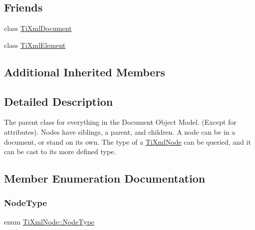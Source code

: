 \subsection*{Friends}
\begin{DoxyCompactItemize}
\item 
class \hyperlink{class_ti_xml_node_a173617f6dfe902cf484ce5552b950475}{Ti\+Xml\+Document}
\item 
class \hyperlink{class_ti_xml_node_ab6592e32cb9132be517cc12a70564c4b}{Ti\+Xml\+Element}
\end{DoxyCompactItemize}
\subsection*{Additional Inherited Members}


\subsection{Detailed Description}
The parent class for everything in the Document Object Model. (Except for attributes). Nodes have siblings, a parent, and children. A node can be in a document, or stand on its own. The type of a \hyperlink{class_ti_xml_node}{Ti\+Xml\+Node} can be queried, and it can be cast to its more defined type. 

\subsection{Member Enumeration Documentation}
\mbox{\label{class_ti_xml_node_a836eded4920ab9e9ef28496f48cd95a2}} 
\subsubsection{\texorpdfstring{Node\+Type}{NodeType}}
{\footnotesize\ttfamily enum \hyperlink{class_ti_xml_node_a836eded4920ab9e9ef28496f48cd95a2}{Ti\+Xml\+Node\+::\+Node\+Type}}


